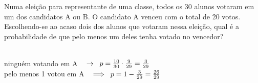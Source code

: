 \begin{ex}
Numa eleição para representante de uma classe, todos os 30 alunos votaram em um dos candidatos A ou B. O candidato A venceu com o total de 20 votos. 
Escolhendo-se ao acaso dois dos alunos que votaram nessa eleição, qual é a probabilidade de que pelo menos um deles tenha votado no vencedor?
 \begin{sol}
  \phantom{A} \\
  ninguém votando em A $\hspace{0,3cm} \rightarrow \hspace{0,2cm} p=\frac{10}{30}\cdot\frac{9}{29}=\frac{3}{29}$\\
  pelo menos 1 votou em A $ \hspace{0,3cm} \Longrightarrow \hspace{0,2cm} p=1-\frac{3}{29}=\frac{26}{29}$
\end{sol}
\end{ex}